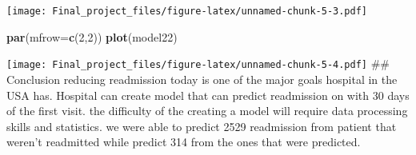\documentclass[
]{article}
\newenvironment{Shaded}{\begin{snugshade}}{\end{snugshade}}
\newcommand{\AttributeTok}[1]{\textcolor[rgb]{0.13,0.29,0.53}{#1}}
\newcommand{\DecValTok}[1]{\textcolor[rgb]{0.00,0.00,0.81}{#1}}
\newcommand{\FunctionTok}[1]{\textcolor[rgb]{0.13,0.29,0.53}{\textbf{#1}}}
\newcommand{\NormalTok}[1]{#1}
\begin{document}
\texttt{[image: Final\_project\_files/figure-latex/unnamed-chunk-5-3.pdf]}

\begin{Shaded}
\begin{Highlighting}[]
\FunctionTok{par}\NormalTok{(}\AttributeTok{mfrow=}\FunctionTok{c}\NormalTok{(}\DecValTok{2}\NormalTok{,}\DecValTok{2}\NormalTok{))}
\FunctionTok{plot}\NormalTok{(model22)}
\end{Highlighting}
\end{Shaded}

\texttt{[image: Final\_project\_files/figure-latex/unnamed-chunk-5-4.pdf]}
\#\# Conclusion reducing readmission today is one of the major goals
hospital in the USA has. Hospital can create model that can predict
readmission on with 30 days of the first visit. the difficulty of the
creating a model will require data processing skills and statistics. we
were able to predict 2529 readmission from patient that weren't
readmitted while predict 314 from the ones that were predicted.
\end{document}
